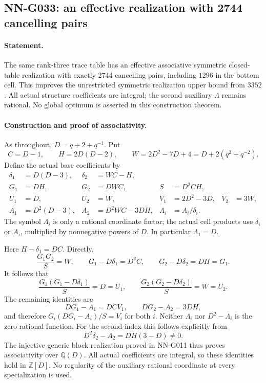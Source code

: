 \subsection{NN-G033: an effective realization with 2744 cancelling pairs}
\paragraph{Statement.}
The same rank-three trace table has an effective associative
symmetric closed-table realization with exactly $2744$
cancelling pairs, including $1296$ in the bottom cell.
This improves the unrestricted symmetric realization upper
bound from $3352$. All actual structure coefficients are
integral; the second auxiliary $\Lambda$ remains rational.
No global optimum is asserted in this construction theorem.

\paragraph{Construction and proof of associativity.}
As throughout, $D=q+2+q^{-1}$. Put
\[
 C=D-1,\qquad H=2D(D-2),\qquad
 W=2D^2-7D+4=D+2(q^2+q^{-2}).
\]
Define the actual base coefficients by
\[
 \begin{aligned}
 \delta_1&=D(D-3),&\delta_2&=WC-H,\\
 G_1&=DH,&G_2&=DWC,&S&=D^2CH,\\
 U_1&=D,&U_2&=W,&V_1&=2D^2-3D,&V_2&=3W,\\
 A_1&=D^2(D-3),&A_2&=D^2WC-3DH,&
 \Lambda_i&=A_i/\delta_i.
 \end{aligned}                                                       \tag{G033.1}
\]
The symbol $\Lambda_i$ is only a rational coordinate
factor; the actual cell products use $\delta_i$ or
$A_i$, multiplied by nonnegative powers of $D$.
In particular $\Lambda_1=D$.

Here $H-\delta_1=DC$. Directly,
\[
 \frac{G_1G_2}{S}=W,\qquad
 G_1-D\delta_1=D^2C,\qquad
 G_2-D\delta_2=DH=G_1.
\]
It follows that
\[
 \frac{G_1(G_1-D\delta_1)}S=D=U_1,
 \qquad
 \frac{G_2(G_2-D\delta_2)}S=W=U_2.
\]
The remaining identities are
\[
 DG_1-A_1=DCV_1,\qquad DG_2-A_2=3DH,
\]
and therefore $G_i(DG_i-A_i)/S=V_i$ for both $i$.
Neither $\Lambda_i$ nor $D^2-\Lambda_i$ is the zero
rational function. For the second index this follows
explicitly from
\[
 D^2\delta_2-A_2=DH(3-D)\ne0.
\]
The injective generic block realization proved in
NN-G011 thus proves associativity over $\mathbb Q(D)$.
All actual coefficients are integral, so these identities
hold in $\mathbb Z[D]$. No regularity of the auxiliary
rational coordinate at every specialization is used.

